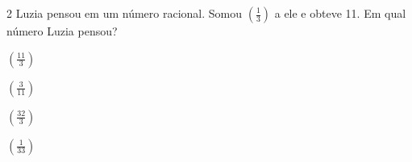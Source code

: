 









\num{2} Luzia pensou em um número racional. Somou $(\frac{1}{3})$ a ele e
obteve 11. Em qual número Luzia pensou?

\begin{escolha}[itemsep=0pt]
\item $(\frac{11}{3})$
\item $(\frac{3}{11})$
\item $(\frac{32}{3})$
\item $(\frac{1}{33})$
\end{escolha}




